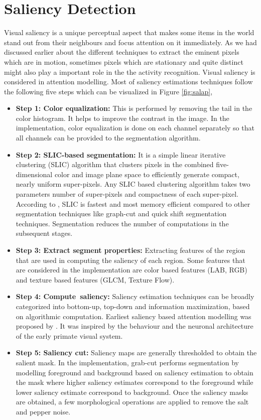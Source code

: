 \section{Saliency Detection}
\label{sec:sal}
Visual saliency is a unique perceptual aspect that makes some items in the world stand out from their neighbours and focus attention on it immediately.  As we had discussed earlier about the different techniques to extract the eminent pixels which are in motion, sometimes pixels which are stationary and quite distinct might also play a important role in the the activity recognition.  Visual saliency is considered in attention modelling.  Most of saliency estimations techniques follow the following five steps which can be visualized in Figure \ref{fig:salap},
\begin{itemize}
\item{\textbf{Step 1: Color equalization:} This is performed by removing the tail in the color histogram.  It helps to improve the contrast in the image.  In the implementation, color equalization is done on each channel separately so that all channels can be provided to the segmentation algorithm.}

\item{ \textbf{Step 2: SLIC-based segmentation:}  It is a simple linear iterative clustering (SLIC) algorithm that clusters pixels in the combined five-dimensional color and image plane space to efficiently generate compact, nearly uniform super-pixels.  Any SLIC based clustering algorithm takes two parameters number of super-pixels and compactness of each super-pixel.  According to \cite{slic}, SLIC is fastest and most memory efficient compared to  other segmentation techniques like graph-cut and quick shift segmentation techniques.  Segmentation reduces the number of computations in the subsequent stages.}

\item{ \textbf{Step 3: Extract segment properties:} Extracting features of the region that are used in computing the saliency of each region.  Some features that are considered in the implementation are color based features (LAB, RGB) and texture based features (GLCM, Texture Flow).}

\item{\textbf{Step 4: Compute~saliency:} Saliency estimation techniques can be broadly categorized into bottom-up, top-down and information maximization, based on algorithmic computation. Earliest saliency based attention modelling was proposed by \cite{itti}.  It was inspired by the behaviour and the neuronal architecture of the early primate visual system.}

\item{\textbf{Step 5: Saliency cut:} Saliency maps are generally thresholded to obtain the salient mask.  In the implementation, grab-cut\citep{grabCut} performs segmentation by modelling foreground and background based on saliency estimation to obtain the mask where higher saliency  estimates correspond to the foreground while lower saliency estimate correspond to background.  Once the saliency masks are obtained, a few morphological operations are applied to remove the salt and pepper noise.}
\end{itemize}

